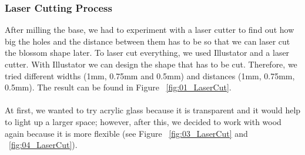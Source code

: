 \documentclass[04.3_buildingProcess.tex]{subfiles}
\begin{document}
    \subsubsection{Laser Cutting Process}
    \begin{flushleft}
        \noindent
        After milling the base, we had to experiment with a laser cutter to find out how big the holes and the 
        distance between them has to be so that we can laser cut the blossom shape later. To laser cut 
        everything, we used Illustator\cite{illustrator} and a laser cutter. With Illustator we can design 
        the shape that has to be cut. Therefore, we tried different widths (1mm, 0.75mm and 0.5mm) and 
        distances (1mm, 0.75mm, 0.5mm). The result can be found in Figure ~\ref{fig:01_LaserCut}.\\~\\

        \noindent
        At first, we wanted to try acrylic glass because it is transparent and it would help to light up 
        a larger space; however, after this, we decided to work with wood again because it is more flexible
        (see Figure ~\ref{fig:03_LaserCut} and ~\ref{fig:04_LaserCut}).


\end{flushleft}
\end{document}

